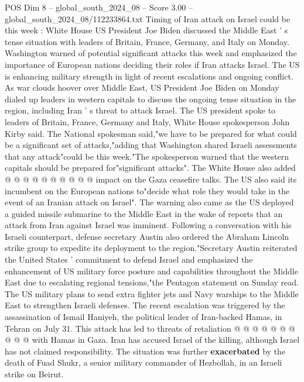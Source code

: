 \begin{textsample}{POS Dim 8 – global\_south\_2024\_08 – Score 3.00 – global\_south\_2024\_08/112233864.txt}  \label{ex:f8_pos_378}
Timing of Iran attack on Israel could be this week : White House US President Joe Biden discussed the Middle East ' s tense situation with leaders of Britain, France, Germany, and Italy on Monday.
Washington warned of potential significant attacks this week and emphasized the importance of European nations deciding their roles if Iran attacks Israel.
The US is enhancing military strength in light of recent escalations and ongoing conflict.
As war clouds hoover over Middle East, US President Joe Biden on Monday dialed up leaders in western capitals to discuss the ongoing tense situation in the region, including Iran ' s threat to attack Israel.
The US president spoke to leaders of Britain, France, Germany and Italy, White House spokesperson John Kirby said.
The National spokesman said,"we have to be prepared for what could be a significant set of attacks,"adding that Washington shared Israeli assessments that any attack"could be this week."The spokesperson warned that the western capitals should be prepared for"significant attacks".
The White House also added @ @ @ @ @ @ @ @ @ @ impact on the Gaza ceasefire talks.
The US also said its incumbent on the European nations to"decide what role they would take in the event of an Iranian attack on Israel".
The warning also came as the US deployed a guided missile submarine to the Middle East in the wake of reports that an attack from Iran against Israel was imminent.
Following a conversation with his Israeli counterpart, defense secretary Austin also ordered the Abraham Lincoln strike group to expedite its deployment to the region."Secretary Austin reiterated the United States ' commitment to defend Israel and emphasized the enhancement of US military force posture and capabilities throughout the Middle East due to escalating regional tensions,"the Pentagon statement on Sunday read.
The US military plans to send extra fighter jets and Navy warships to the Middle East to strengthen Israeli defenses.
The recent escalation was triggered by the assassination of Ismail Haniyeh, the political leader of Iran-backed Hamas, in Tehran on July 31.
This attack has led to threats of retaliation @ @ @ @ @ @ @ @ @ @ with Hamas in Gaza.
Iran has accused Israel of the killing, although Israel has not claimed responsibility.
The situation was further \textbf{exacerbated} by the death of Fuad Shukr, a senior military commander of Hezbollah, in an Israeli strike on Beirut.

\end{textsample}
